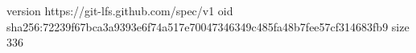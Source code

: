 version https://git-lfs.github.com/spec/v1
oid sha256:72239f67bca3a9393e6f74a517e70047346349c485fa48b7fee57cf314683fb9
size 336
